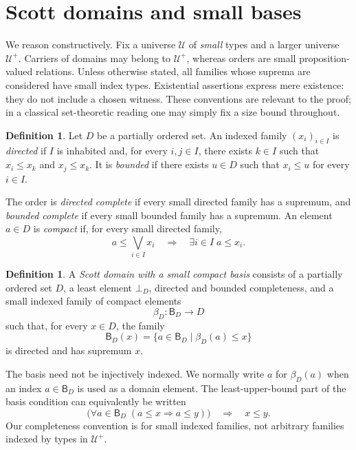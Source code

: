 \documentclass[11pt,a4paper]{article}
\theoremstyle{definition}
\newtheorem{definition}[theorem]{Definition}
\theoremstyle{remark}
\newcommand{\UU}{\mathcal U}
\newcommand{\B}{\mathsf B}
\newcommand{\lub}{\bigvee}
\begin{document}
\section{Scott domains and small bases}

We reason constructively. Fix a universe $\UU$ of \emph{small} types and a
larger universe $\UU^+$. Carriers of domains may belong to $\UU^+$, whereas
orders are small proposition-valued relations. Unless otherwise stated,
all families whose suprema are considered have small index types.
Existential assertions express mere existence: they do not include a
chosen witness. These conventions are relevant to the proof; in a
classical set-theoretic reading one may simply fix a size bound throughout.

\begin{definition}
Let $D$ be a partially ordered set. An indexed family $(x_i)_{i\in I}$ is
\emph{directed} if $I$ is inhabited and, for every $i,j\in I$, there exists
$k\in I$ such that $x_i\leq x_k$ and $x_j\leq x_k$. It is \emph{bounded}
if there exists $u\in D$ such that $x_i\leq u$ for every $i\in I$.

The order is \emph{directed complete} if every small directed family has a
supremum, and \emph{bounded complete} if every small bounded family has a
supremum. An element $a\in D$ is \emph{compact} if, for every small directed
family,
\[
 a\leq\lub_{i\in I}x_i
 \quad\Longrightarrow\quad
 \exists i\in I\; a\leq x_i.
\]
\end{definition}

\begin{definition}\label{def:scott}
A \emph{Scott domain with a small compact basis} consists of a partially
ordered set $D$, a least element $\bot_D$, directed and bounded completeness,
and a small indexed family of compact elements
\[
 \beta_D:\B_D\longrightarrow D
\]
such that, for every $x\in D$, the family
\[
 \B_D(x)=\{a\in\B_D\mid\beta_D(a)\leq x\}
\]
is directed and has supremum $x$.
\end{definition}

The basis need not be injectively indexed. We normally write $a$ for
$\beta_D(a)$ when an index $a\in\B_D$ is used as a domain element.
The least-upper-bound part of the basis condition can equivalently be
written
\begin{equation}\label{eq:density}
 \bigl(\forall a\in\B_D\;(a\leq x\Longrightarrow a\leq y)\bigr)
 \quad\Longrightarrow\quad x\leq y.
\end{equation}
Our completeness convention is for small indexed families, not arbitrary
families indexed by types in $\UU^+$.
\end{document}
